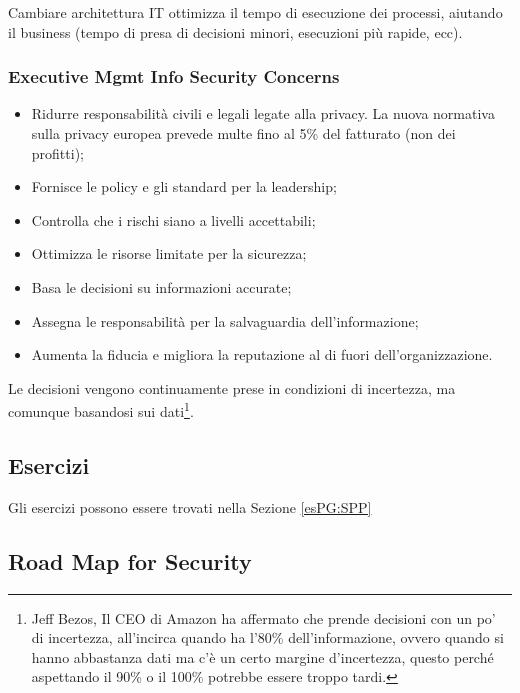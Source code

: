 Cambiare architettura IT ottimizza il tempo di esecuzione dei processi, aiutando
il business (tempo di presa di decisioni minori, esecuzioni più rapide, ecc).

\subsubsection{Executive Mgmt Info Security Concerns}

\begin{itemize}
\item Ridurre responsabilità civili e legali legate alla privacy. La nuova
normativa sulla privacy europea prevede multe fino al 5\% del fatturato (non dei
profitti);
\item Fornisce le policy e gli standard per la leadership;
\item Controlla che i rischi siano a livelli accettabili;
\item Ottimizza le risorse limitate per la sicurezza;
\item Basa le decisioni su informazioni accurate;
\item Assegna le responsabilità per la salvaguardia dell'informazione;
\item Aumenta la fiducia e migliora la reputazione al di fuori
dell'organizzazione.
\end{itemize}


Le decisioni vengono continuamente prese in condizioni di incertezza, ma
comunque basandosi sui dati\footnote{Jeff Bezos, Il CEO di Amazon ha
affermato che prende decisioni con un po' di incertezza, all'incirca
quando ha l'80\% dell'informazione, ovvero quando si hanno abbastanza
dati ma c'è un certo margine d'incertezza, questo perché aspettando il
90\% o il 100\% potrebbe essere troppo tardi.}.


\subsection{Esercizi}

Gli esercizi possono essere trovati nella Sezione \ref{esPG:SPP}
\newpage
\subsection{Road Map for Security}

